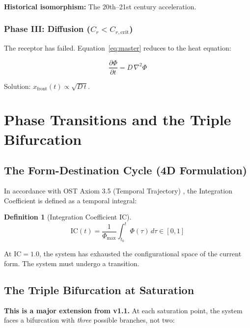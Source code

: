 \documentclass[12pt,a4paper]{article}
\newtheorem{definition}{Definition}[section]
\newcommand{\reag}{C_r}
\newcommand{\reagcrit}{C_{r,\mathrm{crit}}}
\newcommand{\IC}{\mathrm{IC}}
\begin{document}
\textbf{Historical isomorphism:} The 20th--21st century acceleration.

\subsubsection{Phase III: Diffusion ($\reag < \reagcrit$)}

The receptor has failed. Equation~\eqref{eq:master} reduces to the heat equation:

\begin{equation}\label{eq:heat}
\frac{\partial \Phi}{\partial t} = D\,\nabla^2 \Phi
\end{equation}

Solution: $x_{\text{front}}(t) \propto \sqrt{D\,t}$.


\section{Phase Transitions and the Triple Bifurcation}\label{sec:phases}

\subsection{The Form-Destination Cycle (4D Formulation)}

In accordance with OST Axiom 3.5 (Temporal Trajectory) \cite{ost_v21}, the Integration Coefficient is defined as a temporal integral:

\begin{definition}[Integration Coefficient $\IC$]\label{def:IC}
\begin{equation}\label{eq:IC_integral}
\IC(t) = \frac{1}{\Phi_{\max}}\int_{t_0}^{t} \Phi(\tau)\,d\tau \in [0, 1]
\end{equation}
\end{definition}

At $\IC = 1.0$, the system has exhausted the configurational space of the current form. The system must undergo a transition.

\subsection{The Triple Bifurcation at Saturation}

\textbf{This is a major extension from v1.1.} At each saturation point, the system faces a bifurcation with \emph{three} possible branches, not two:
\end{document}
